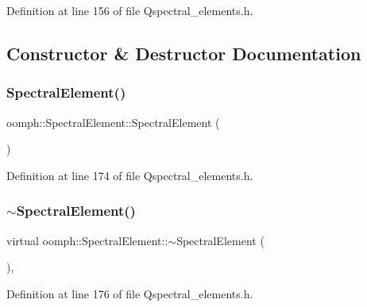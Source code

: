 Definition at line 156 of file Qspectral\+\_\+elements.\+h.



\subsection{Constructor \& Destructor Documentation}
\mbox{\label{classoomph_1_1SpectralElement_ad593a485187297e53b82cf9c22be8a11}} 
\subsubsection{\texorpdfstring{Spectral\+Element()}{SpectralElement()}}
{\footnotesize\ttfamily oomph\+::\+Spectral\+Element\+::\+Spectral\+Element (\begin{DoxyParamCaption}{ }\end{DoxyParamCaption})\hspace{0.3cm}{\ttfamily [inline]}}



Definition at line 174 of file Qspectral\+\_\+elements.\+h.

\mbox{\label{classoomph_1_1SpectralElement_a98d3738ce6703db8c52ccd19d82a3451}} 
\subsubsection{\texorpdfstring{$\sim$\+Spectral\+Element()}{~SpectralElement()}}
{\footnotesize\ttfamily virtual oomph\+::\+Spectral\+Element\+::$\sim$\+Spectral\+Element (\begin{DoxyParamCaption}{ }\end{DoxyParamCaption})\hspace{0.3cm}{\ttfamily [inline]}, {\ttfamily [virtual]}}



Definition at line 176 of file Qspectral\+\_\+elements.\+h.



